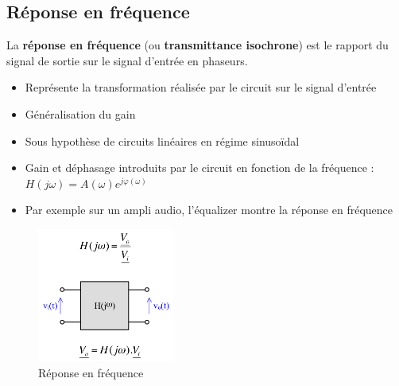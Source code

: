 \documentclass[a4paper]{article}
\begin{document}
    \subsection{Réponse en fréquence}
        La \textbf{réponse en fréquence} (ou \textbf{transmittance isochrone}) est le rapport du signal de sortie sur le signal d'entrée en phaseurs.
        \begin{itemize}
            \item Représente la transformation réalisée par le circuit sur le signal d'entrée
            \item Généralisation du gain
            \item Sous hypothèse de circuits linéaires en régime sinusoïdal
            \item Gain et déphasage introduits par le circuit en fonction de la fréquence : $ H(j\omega) = A(\omega)e^{j\varphi(\omega)} $
            \item Par exemple sur un ampli audio, l'équalizer montre la réponse en fréquence
        \end{itemize}
        \begin{figure}[H]
            \begin{center}
                \includegraphics[width=0.4\textwidth]{fig/2_reponse.png}
                \caption{Réponse en fréquence}
                \label{fig:2_superposition}
            \end{center}
        \end{figure}
\end{document}
